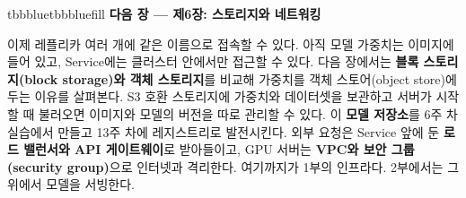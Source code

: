 \begin{calloutbox}{tbbblue}{tbbbluefill}
{\normalsize\bfseries\color{tbbblue}다음 장 — 제6장: 스토리지와 네트워킹}\par\vspace{3pt}
이제 레플리카 여러 개에 같은 이름으로 접속할 수 있다. 아직 모델 가중치는 이미지에 들어 있고, Service에는 클러스터 안에서만 접근할 수 있다. 다음 장에서는 \textbf{블록 스토리지(block storage)와 객체 스토리지}를 비교해 가중치를 객체 스토어(object store)에 두는 이유를 살펴본다. S3 호환 스토리지에 가중치와 데이터셋을 보관하고 서버가 시작할 때 불러오면 이미지와 모델의 버전을 따로 관리할 수 있다. 이 \textbf{모델 저장소}를 6주 차 실습에서 만들고 13주 차에 레지스트리로 발전시킨다. 외부 요청은 Service 앞에 둔 \textbf{로드 밸런서와 API 게이트웨이}로 받아들이고, GPU 서버는 \textbf{VPC와 보안 그룹(security group)}으로 인터넷과 격리한다. 여기까지가 1부의 인프라다. 2부에서는 그 위에서 모델을 서빙한다.
\end{calloutbox}
